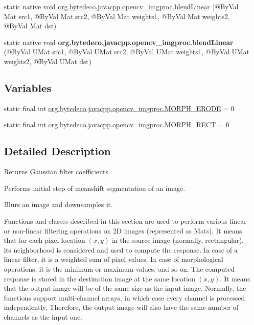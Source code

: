 \begin{DoxyCompactItemize}
\item 
static native void \hyperlink{group__imgproc__filter_gadbbb8985760a3feef02011466803a5a2}{org.\+bytedeco.\+javacpp.\+opencv\+\_\+imgproc.\+blend\+Linear} (@By\+Val Mat src1, @By\+Val Mat src2, @By\+Val Mat weights1, @By\+Val Mat weights2, @By\+Val Mat dst)
\item 
\mbox{\label{group__imgproc__filter_gacecd2a8eb530d74bf8a70ac2497c5945}} 
static native void {\bfseries org.\+bytedeco.\+javacpp.\+opencv\+\_\+imgproc.\+blend\+Linear} (@By\+Val U\+Mat src1, @By\+Val U\+Mat src2, @By\+Val U\+Mat weights1, @By\+Val U\+Mat weights2, @By\+Val U\+Mat dst)
\end{DoxyCompactItemize}
\subsection*{Variables}
\begin{DoxyCompactItemize}
\item 
static final int \hyperlink{group__imgproc__filter_ga0f22b83b4ad2465132087b8d059a2101}{org.\+bytedeco.\+javacpp.\+opencv\+\_\+imgproc.\+M\+O\+R\+P\+H\+\_\+\+E\+R\+O\+DE} = 0
\item 
static final int \hyperlink{group__imgproc__filter_ga8380bc8d565b30f65b81f16987e9edeb}{org.\+bytedeco.\+javacpp.\+opencv\+\_\+imgproc.\+M\+O\+R\+P\+H\+\_\+\+R\+E\+CT} = 0
\end{DoxyCompactItemize}


\subsection{Detailed Description}
Returns Gaussian filter coefficients. 

Performs initial step of meanshift segmentation of an image.

Blurs an image and downsamples it.

Functions and classes described in this section are used to perform various linear or non-\/linear filtering operations on 2D images (represented as Mat\textquotesingle{}s). It means that for each pixel location $(x,y)$ in the source image (normally, rectangular), its neighborhood is considered and used to compute the response. In case of a linear filter, it is a weighted sum of pixel values. In case of morphological operations, it is the minimum or maximum values, and so on. The computed response is stored in the destination image at the same location $(x,y)$. It means that the output image will be of the same size as the input image. Normally, the functions support multi-\/channel arrays, in which case every channel is processed independently. Therefore, the output image will also have the same number of channels as the input one. 

